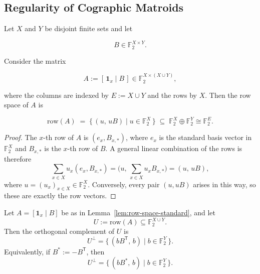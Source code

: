 \subsection{Regularity of Cographic Matroids}

\begin{lemma}
    \label{lem:row-space-standard}
    Let $X$ and $Y$ be disjoint finite sets and let
    
    \[
      B \in \mathbb{F}_2^{X \times Y}.
    \]

    Consider the matrix
    
    \[ A := [\, \mathbf{1}_x \mid B \,] \in \mathbb{F}_2^{X \times (X \cup Y)},\]
    
    where the columns are indexed by $E := X \cup Y$ and the rows by $X$.
    Then the row space of $A$ is
    
    \[ \text{row}(A) \;=\; \{\, (u,\, uB) \mid u \in \mathbb{F}_2^X \,\} \;\subseteq\; \mathbb{F}_2^X \oplus \mathbb{F}_2^Y \cong \mathbb{F}_2^{E}. \]
\end{lemma}

\begin{proof}
    The $x$-th row of $A$ is $(e_x, B_{x,*})$, where $e_x$ is the standard basis vector
    in $\mathbb{F}_2^X$ and $B_{x,*}$ is the $x$-th row of $B$.
    A general linear combination of the rows is therefore
    \[
      \sum_{x \in X} u_x (e_x, B_{x,*})
      = \bigl( u,\, \sum_{x \in X} u_x B_{x,*} \bigr)
      = (u,\, uB),
    \]
    where $u = (u_x)_{x \in X} \in \mathbb{F}_2^X$.
    Conversely, every pair $(u, uB)$ arises in this way, so these are exactly the row vectors.
\end{proof}

\begin{lemma}
    \label{lem:orth-complement-standard}
    Let $A = [\mathbf{1}_x \mid B]$ be as in Lemma~\ref{lem:row-space-standard}, and let
    \[U := \text{row}(A) \subseteq \mathbb{F}_2^{X \cup Y}.\]
    Then the orthogonal complement of $U$ is
    \[U^\perp = \{\, (b B^{\mathsf T},\, b) \mid b \in \mathbb{F}_2^Y \,\}.\]
    Equivalently, if $B^* := -B^{\mathsf T}$, then
    \[U^\perp= \{\, (b B^*,\, b) \mid b \in \mathbb{F}_2^Y \,\}.
    \]
\end{lemma}

